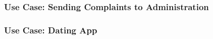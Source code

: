 \begin{frame}[t]
    \frametitle{Use Case: Sending Complaints to Administration}
    
\end{frame}

\begin{frame}[t]
    \frametitle{Use Case: Dating App}
    
\end{frame}
